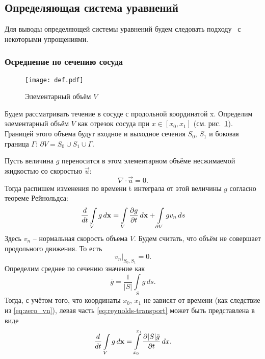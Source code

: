 \subsection{Определяющая система уравнений}
Для выводы определяющей системы уравнений будем следовать подходу~\cite{Hughes1973}
с некоторыми упрощениями.

\subsubsection{Осреднение по сечению сосуда}

\begin{figure}[h]
    \centering
    \texttt{[image: def.pdf]}
    \caption{Элементарный объём $V$}
    \label{fig:elementary_volume}
\end{figure}

Будем рассматривать течение в сосуде с продольной координатой \gls{x}.
Определим элементарный объём $V$ как отрезок сосуда при $x\in[x_0, x_1]$ (см. рис.~\ref{fig:elementary_volume}).
Границей этого объема будут входное и выходное сечения $S_0$, $S_1$ и
боковая граница $\Gamma$: $\partial V = S_0 \cup S_1 \cup \Gamma$.

Пусть величина $g$ переносится в этом элементарном объёме несжимаемой
жидкостью со скоростью $\vec u$:
\begin{equation}
\label{eq:divu}
\nabla\cdot \vec u = 0.
\end{equation}
Тогда распишем изменения по времени \gls{t}  интеграла от этой величины $g$ согласно теореме Рейнольдса:
\begin{equation}
\label{eq:reynolds-transport}
\frac{d}{dt}\int\limits_{V}g\,d\boldsymbol{\rm x} = 
\int\limits_{V}\frac{\partial g}{\partial t}\,d\boldsymbol{\rm x} + \int\limits_{\partial V} g v_n \,d s
\end{equation}
Здесь $v_n$ -- нормальная скорость объема $V$.
Будем считать, что объём не совершает продольного движения. То есть
\begin{equation}
\label{eq:zero_vn}
\left.v_n\right|_{S_0, S_1} = 0.
\end{equation}
Определим среднее по сечению значение как
\begin{equation}
\label{eq:average_g}
\bar g = \frac{1}{|S|}\int\limits_S g \, ds.
\end{equation}
Тогда, с учётом того, что координаты $x_0$, $x_1$ не зависят
от времени (как следствие из \cref{eq:zero_vn}), левая часть \cref{eq:reynolds-transport} может быть представлена
в виде
\begin{equation}
\label{eq:left_in_reynolds_transport}
\frac{d}{dt}\int\limits_{V}g\,d\boldsymbol{\rm x} = 
\int\limits_{x_0}^{x_1} \frac{\partial |S| \bar g}{\partial t} \, dx.
\end{equation}

